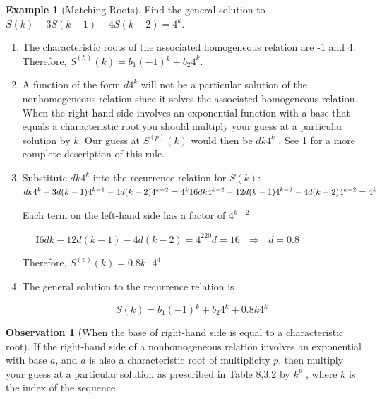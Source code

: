 \documentclass[10pt,]{book}
\theoremstyle{plain}
\theoremstyle{definition}
\theoremstyle{definition}
\newtheorem{observation}[theorem]{Observation}
\theoremstyle{definition}
\newtheorem{example}[theorem]{Example}
\theoremstyle{definition}
\numberwithin{equation}{section}
\begin{document}
\begin{example}[Matching Roots]\label{ex-matching-roots}
 Find the general solution to \(S(k) - 3 S(k - 1) - 4 S(k - 2) = 4^k\).%
\par
\leavevmode%
\begin{enumerate}[label=\alph*]
\item\hypertarget{li-66}{}The characteristic roots of the associated homogeneous relation are -1 and 4. Therefore, \(S^{(h)}(k)=b_1(-1){}^k+ b_2 4^k\).%
\item\hypertarget{li-67}{}A function of the form \(d 4^k\) will not be a particular solution of the nonhomogeneous relation since it solves the associated homogeneous
relation. When the right-hand side involves an exponential function with a base that equals a characteristic root,you should multiply your guess
at a particular solution by \(k\). Our guess at \(S^{(p)}(k)\) would then be \(d k 4^k\) . See \hyperref[obs-matching-base]{\ref{obs-matching-base}} for a more complete description of this rule.%
\item\hypertarget{li-68}{}Substitute \(d k 4^k\) into the recurrence relation for \(S(k)\):
\(\quad\)\(d k 4^k-3d (k-1) 4^{k-1}-4d (k-2) 4^{k-2}=4^k\\
\\
16d k 4^{k-2}-12d (k-1) 4^{k-2}-4d (k-2) 4^{k-2}=4^k\)

Each term on the left-hand side has a factor of \(4^{k-2}\) 

 \(\quad\) \(\textrm{I6} d k - 12d(k - 1) - 4d(k - 2) = 4^220 d = 16\textrm{   }\Rightarrow \textrm{   }d=0.8\)

Therefore, \(S^{(p)}(k) = 0.8 k\textrm{  }4^4\)%
\item\hypertarget{li-69}{}The general solution to the recurrence relation is

\[S(k) =b_1(-1){}^k+ b_2 4^k +0.8 k 4^k\]
%
\end{enumerate}
%
\end{example}
\begin{observation}[When the base of right-hand side is equal to a characteristic root]\label{obs-matching-base}
 If the right-hand side of a nonhomogeneous relation involves an exponential with base \(a\), and \(a\) is also a characteristic root
of multiplicity \(p\), then multiply your guess at a particular solution as prescribed in Table 8,3.2 by \(k^p\) , where \(k\) is the
index of the sequence.%
\end{observation}
\end{document}
